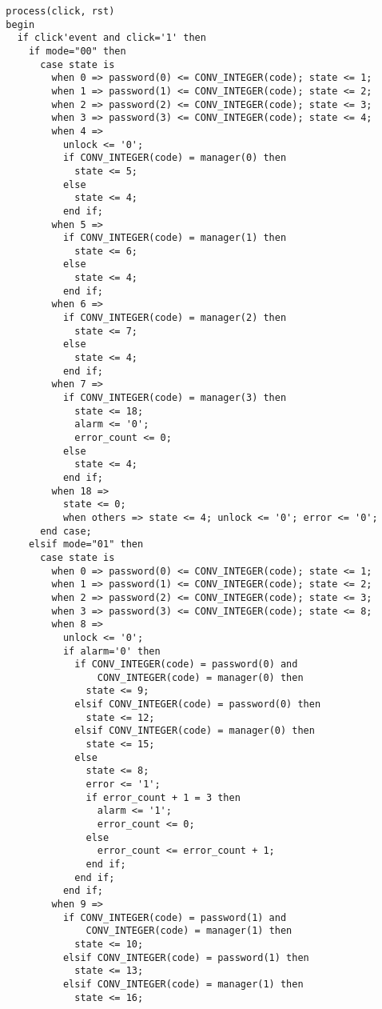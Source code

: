 \documentclass[a4paper]{article}
\begin{document}
\begin{lstlisting}
  process(click, rst)
  begin
    if click'event and click='1' then
      if mode="00" then
        case state is
          when 0 => password(0) <= CONV_INTEGER(code); state <= 1;
          when 1 => password(1) <= CONV_INTEGER(code); state <= 2;
          when 2 => password(2) <= CONV_INTEGER(code); state <= 3;
          when 3 => password(3) <= CONV_INTEGER(code); state <= 4;
          when 4 => 
            unlock <= '0';
            if CONV_INTEGER(code) = manager(0) then
              state <= 5;
            else
              state <= 4;
            end if;
          when 5 => 
            if CONV_INTEGER(code) = manager(1) then
              state <= 6;
            else
              state <= 4;
            end if;
          when 6 => 
            if CONV_INTEGER(code) = manager(2) then
              state <= 7;
            else
              state <= 4;
            end if;
          when 7 => 
            if CONV_INTEGER(code) = manager(3) then
              state <= 18;
              alarm <= '0';
              error_count <= 0;
            else
              state <= 4;
            end if;
          when 18 => 
            state <= 0;
            when others => state <= 4; unlock <= '0'; error <= '0';
        end case;
      elsif mode="01" then
        case state is
          when 0 => password(0) <= CONV_INTEGER(code); state <= 1;
          when 1 => password(1) <= CONV_INTEGER(code); state <= 2;
          when 2 => password(2) <= CONV_INTEGER(code); state <= 3;
          when 3 => password(3) <= CONV_INTEGER(code); state <= 8;
          when 8 => 
            unlock <= '0';
            if alarm='0' then
              if CONV_INTEGER(code) = password(0) and 
                  CONV_INTEGER(code) = manager(0) then
                state <= 9;
              elsif CONV_INTEGER(code) = password(0) then
                state <= 12;
              elsif CONV_INTEGER(code) = manager(0) then
                state <= 15;
              else
                state <= 8;
                error <= '1';
                if error_count + 1 = 3 then
                  alarm <= '1';
                  error_count <= 0;
                else
                  error_count <= error_count + 1;
                end if;
              end if;
            end if;
          when 9 => 
            if CONV_INTEGER(code) = password(1) and 
                CONV_INTEGER(code) = manager(1) then
              state <= 10;
            elsif CONV_INTEGER(code) = password(1) then
              state <= 13;
            elsif CONV_INTEGER(code) = manager(1) then
              state <= 16;

\end{lstlisting}
\end{document}
